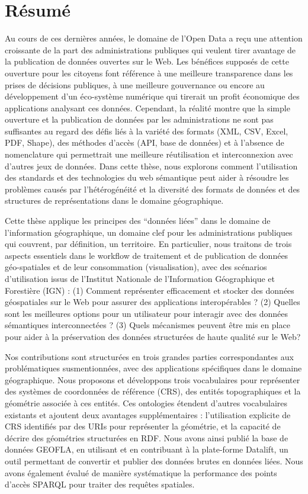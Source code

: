 \documentclass[a4paper,11pt,twoside]{report}
\begin{document}
\chapter*{R\'{e}sum\'{e}}
Au cours de ces dernières années, le domaine de l'Open Data a reçu une attention croissante de la part des administrations publiques qui veulent tirer avantage de la publication de données ouvertes sur le Web. Les bénéfices supposés de cette ouverture pour les citoyens font référence à une meilleure transparence dans les prises de décisions publiques, à une meilleure gouvernance ou encore au développement d'un éco-système numérique qui tirerait un profit économique des applications analysant ces données. Cependant, la réalité montre que la simple ouverture et la publication de données par les administrations ne sont pas suffisantes au regard des défis liés à la variété des formats (XML, CSV, Excel, PDF, Shape), des méthodes d'accès (API, base de données) et à l'absence de nomenclature qui permettrait une meilleure réutilisation et interconnexion avec d'autres jeux de données. Dans cette thèse, nous explorons comment l'utilisation des standards et des technologies du web sémantique peut aider à résoudre les problèmes causés par l'hétérogénéité et la diversité des formats de données et des structures de représentations dans le domaine géographique.

Cette thèse applique les principes des ``données liées'' dans le domaine de l'information géographique, un domaine clef pour les administrations publiques qui couvrent, par définition, un territoire. En particulier, nous traitons de trois aspects essentiels dans le workflow de traitement et de publication de données géo-spatiales et de leur consommation (visualisation), avec des scénarios d'utilisation issus de l’Institut Nationale de l’Information Géographique et Forestière (IGN) : (1) Comment représenter efficacement et stocker des données géospatiales sur le Web pour assurer des applications interopérables ? (2) Quelles sont les meilleures options pour un utilisateur pour interagir avec des données sémantiques interconnectées ? (3) Quels mécanismes peuvent être mis en place pour aider à la préservation des données structurées de haute qualité sur le Web?

Nos contributions sont structurées en trois grandes parties correspondantes aux problématiques susmentionnées, avec des applications spécifiques dans le domaine géographique. Nous proposons et développons trois vocabulaires pour représenter des systèmes de coordonnées de référence (CRS), des entités topographiques et la géométrie associée à ces entités. Ces ontologies étendent d'autres vocabulaires existants et ajoutent deux avantages supplémentaires : l’utilisation explicite de CRS identifiés par des URIs pour représenter la géométrie, et la capacité de décrire des géométries structurées en RDF. Nous avons ainsi publié la base de données GEOFLA, en utilisant et en contribuant à la plate-forme Datalift, un outil permettant de convertir et publier des données brutes en données liées. Nous avons également évalué de manière systématique la performance des points d'accès SPARQL pour traiter des requêtes spatiales.
\end{document}
